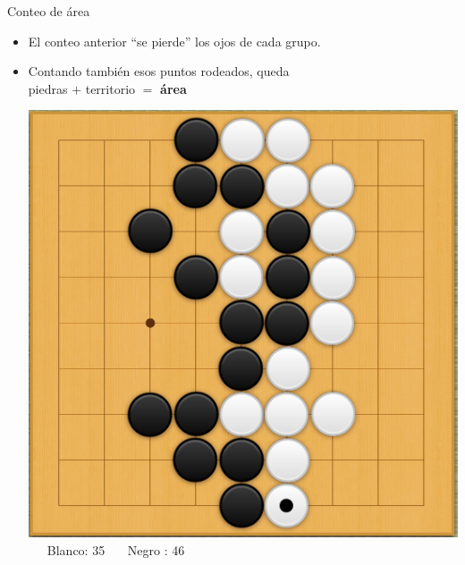 \documentclass{beamer}
\begin{document}
\begin{frame}{Conteo de área}
  
  \begin{itemize}
    \item El conteo anterior ``se pierde'' los ojos de cada grupo.
    \item Contando también esos puntos rodeados, queda\\ {\hfill piedras $+$ territorio $=$ \textbf{área} \hfill}
    
    \includegraphics[scale=0.17]{ejemplo-conteo.png} \ \ \ Blanco: 35 \ \ \ Negro : 46  
  \end{itemize}
  
\end{frame}
\end{document}
